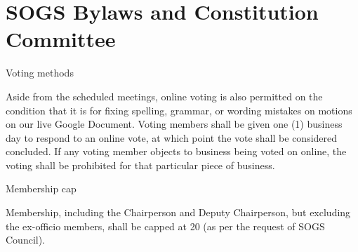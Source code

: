 \section{SOGS Bylaws and Constitution Committee}

\begin{longenum}
 \item Voting methods
 \begin{longenum}
 \item Aside from the scheduled meetings, online voting is also permitted on the condition that it is
for fixing spelling, grammar, or wording mistakes on motions on our live Google Document.
Voting members shall be given one (1) business day to respond to an online vote, at which
point the vote shall be considered concluded. If any voting member objects to business being
voted on online, the voting shall be prohibited for that particular piece of business.
 \end{longenum}
 \item Membership cap
  \begin{longenum}
  \item Membership, including the Chairperson and Deputy Chairperson, but excluding the ex-officio
members, shall be capped at 20 (as per the request of SOGS Council).
  \end{longenum}
\end{longenum}